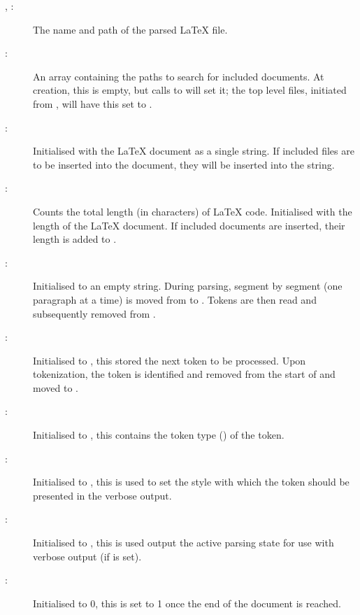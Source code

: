 \documentclass{article}
\newcommand\wild{\ldots}
\begin{document}
\begin{description}

\item[, :] The name and path of the parsed \LaTeX{} file.

\item[:] An array containing the paths to search for included documents. At creation, this is empty, but calls to  will set it; the top level files, initiated from , will have this set to .

\item[:] Initialised with the \LaTeX{} document as a single string. If included files are to be inserted into the document, they will be inserted into the  string.

\item[:] Counts the total length (in characters) of \LaTeX{} code. Initialised with the length of the \LaTeX{} document. If included documents are inserted, their length is added to .

\item[:] Initialised to an empty string. During parsing, segment by segment (one paragraph at a time) is moved from  to . Tokens are then read and subsequently removed from .

\item[:] Initialised to , this stored the next token to be processed. Upon tokenization, the token is identified and removed from the start of  and moved to .

\item[:] Initialised to , this contains the token type (\code{\$TOKEN_\wild}) of the  token.

\item[:] Initialised to , this is used to set the style with which the  token should be presented in the verbose output.

\item[:] Initialised to , this is used output the active parsing state for use with verbose output (if  is set).

\item[:] Initialised to 0, this is set to 1 once the end of the document is reached.


\end{description}
\end{document}

